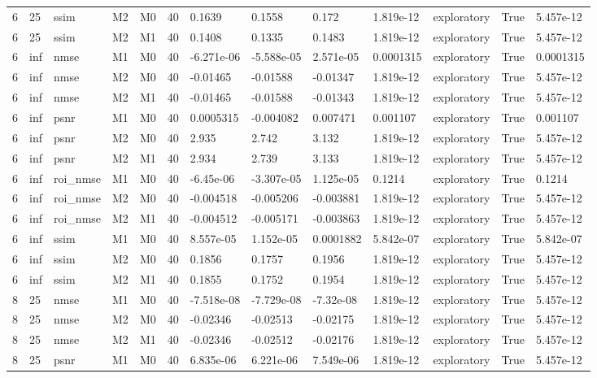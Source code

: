 \begin{tabular}{lllllllllllll}
6 & 25 & ssim & M2 & M0 & 40 & 0.1639 & 0.1558 & 0.172 & 1.819e-12 & exploratory & True & 5.457e-12 \\
6 & 25 & ssim & M2 & M1 & 40 & 0.1408 & 0.1335 & 0.1483 & 1.819e-12 & exploratory & True & 5.457e-12 \\
6 & inf & nmse & M1 & M0 & 40 & -6.271e-06 & -5.588e-05 & 2.571e-05 & 0.0001315 & exploratory & True & 0.0001315 \\
6 & inf & nmse & M2 & M0 & 40 & -0.01465 & -0.01588 & -0.01347 & 1.819e-12 & exploratory & True & 5.457e-12 \\
6 & inf & nmse & M2 & M1 & 40 & -0.01465 & -0.01588 & -0.01343 & 1.819e-12 & exploratory & True & 5.457e-12 \\
6 & inf & psnr & M1 & M0 & 40 & 0.0005315 & -0.004082 & 0.007471 & 0.001107 & exploratory & True & 0.001107 \\
6 & inf & psnr & M2 & M0 & 40 & 2.935 & 2.742 & 3.132 & 1.819e-12 & exploratory & True & 5.457e-12 \\
6 & inf & psnr & M2 & M1 & 40 & 2.934 & 2.739 & 3.133 & 1.819e-12 & exploratory & True & 5.457e-12 \\
6 & inf & roi\_nmse & M1 & M0 & 40 & -6.45e-06 & -3.307e-05 & 1.125e-05 & 0.1214 & exploratory & True & 0.1214 \\
6 & inf & roi\_nmse & M2 & M0 & 40 & -0.004518 & -0.005206 & -0.003881 & 1.819e-12 & exploratory & True & 5.457e-12 \\
6 & inf & roi\_nmse & M2 & M1 & 40 & -0.004512 & -0.005171 & -0.003863 & 1.819e-12 & exploratory & True & 5.457e-12 \\
6 & inf & ssim & M1 & M0 & 40 & 8.557e-05 & 1.152e-05 & 0.0001882 & 5.842e-07 & exploratory & True & 5.842e-07 \\
6 & inf & ssim & M2 & M0 & 40 & 0.1856 & 0.1757 & 0.1956 & 1.819e-12 & exploratory & True & 5.457e-12 \\
6 & inf & ssim & M2 & M1 & 40 & 0.1855 & 0.1752 & 0.1954 & 1.819e-12 & exploratory & True & 5.457e-12 \\
8 & 25 & nmse & M1 & M0 & 40 & -7.518e-08 & -7.729e-08 & -7.32e-08 & 1.819e-12 & exploratory & True & 5.457e-12 \\
8 & 25 & nmse & M2 & M0 & 40 & -0.02346 & -0.02513 & -0.02175 & 1.819e-12 & exploratory & True & 5.457e-12 \\
8 & 25 & nmse & M2 & M1 & 40 & -0.02346 & -0.02512 & -0.02176 & 1.819e-12 & exploratory & True & 5.457e-12 \\
8 & 25 & psnr & M1 & M0 & 40 & 6.835e-06 & 6.221e-06 & 7.549e-06 & 1.819e-12 & exploratory & True & 5.457e-12 \\

\end{tabular}
